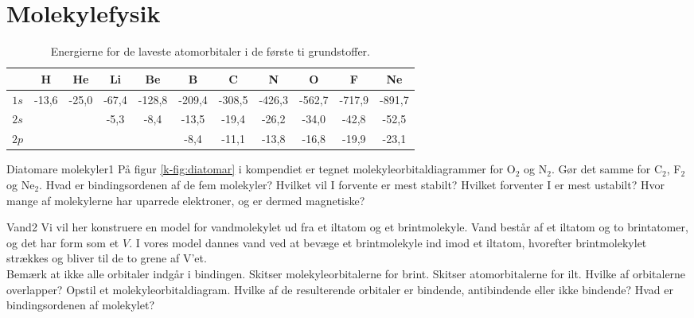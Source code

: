 \section*{Molekylefysik}
\begin{table}[h!]
    \centering
    \begin{tabular}{c|c c c c c c c c c c|}
\hline &H&He&Li&Be&B&C&N&O&F&Ne\\\hline
$1s$&-13,6&-25,0 & -67,4 & -128,8&-209,4&-308,5&-426,3&-562,7&-717,9&-891,7\\
$2s$&&&-5,3&-8,4&-13,5&-19,4&-26,2&-34,0&-42,8&-52,5\\
$2p$&&&&&-8,4&-11,1&-13,8&-16,8&-19,9&-23,1\\\hline
    \end{tabular}
    \caption{Energierne for de laveste atomorbitaler i de første ti grundstoffer.}
    \label{amo:tab:aoenergi}
\end{table}
%
\begin{opgave}{Diatomare molekyler}{1}
\opg På figur \ref{k-fig:diatomar} i kompendiet er tegnet molekyleorbitaldiagrammer for O$_2$ og N$_2$. Gør det samme for C$_2$, F$_2$ og Ne$_2$.
\opg Hvad er bindingsordenen af de fem molekyler?
\opg Hvilket vil I forvente er mest stabilt?
\opg Hvilket forventer I er mest ustabilt?
\opg Hvor mange af molekylerne har uparrede elektroner, og er dermed magnetiske?
\end{opgave}
%
\begin{opgave}{Vand}{2}
Vi vil her konstruere en model for vandmolekylet ud fra et iltatom og et brintmolekyle. Vand består af et iltatom og to brintatomer, og det har form som et $V$. I vores model dannes vand ved at bevæge et brintmolekyle ind imod et iltatom, hvorefter brintmolekylet strækkes og bliver til de to grene af V'et.\\
Bemærk at ikke alle orbitaler indgår i bindingen.
\opg Skitser molekyleorbitalerne for brint.
\opg Skitser atomorbitalerne for ilt.
\opg Hvilke af orbitalerne overlapper?
\opg Opstil et molekyleorbitaldiagram.
\opg Hvilke af de resulterende orbitaler er bindende, antibindende eller ikke bindende?
\opg Hvad er bindingsordenen af molekylet?
\end{opgave}
%
